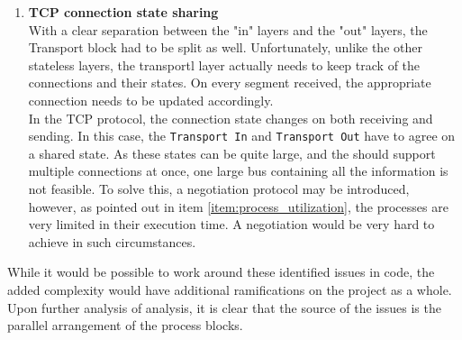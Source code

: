 \begin{enumerate}
\item \textbf{TCP connection state sharing}\\
With a clear separation between the "in" layers and the "out" layers, the 
Transport block had to be split as well. Unfortunately, unlike the other stateless
layers, the transportl layer actually needs to keep track of the connections and 
their states. On every segment received, the appropriate connection needs to be 
updated accordingly.\\
In the TCP protocol, the connection state changes on both receiving and sending.
In this case, the \texttt{Transport In} and \texttt{Transport Out} have to 
agree on a shared state. As these states can be quite large, and the should 
support multiple connections at once, one large bus containing all the information
is not feasible. To solve this, a negotiation protocol may be introduced, however,
as pointed out in item \ref{item:process_utilization}, the processes are very
limited in their execution time. A negotiation would be very hard to achieve in 
such circumstances.

\end{enumerate}

While it would be possible to work around these identified issues in code, the 
added complexity would have additional ramifications on the project as a whole.
Upon further analysis of analysis, it is clear that the source of the issues is 
the parallel arrangement of the process blocks.

